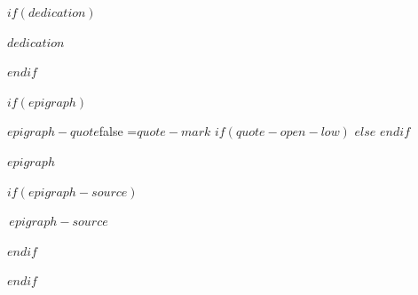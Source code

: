 \clearpage




\clearpage

$if(dedication)$
    \pagestyle{empty}

      \begin{center}

    \vspace*{\fill}
  
      \normalfont\normalsize $dedication$ \par

    \vspace*{\fill}
        \end{center}
    
    \clearpage
$endif$

$if(epigraph)$
    \pagestyle{empty}
    \begin{center}
    \begin{minipage}{0.7\textwidth}
      \setlength{\parindent}{0pt}
      \setlength{\parskip}{6pt}
      \def\epigraphquote{$epigraph-quote$}\def\epigraphnoquote{false}%
      \ifx\epigraphquote\epigraphnoquote\else
      =\hbox{{\normalfont\fontsize{48pt}{48pt}\selectfont\color{black!60}$quote-mark$}}%
      $if(quote-open-low)$
      $else$
      $endif$
      \fi
      {\itshape $epigraph$\par}
    $if(epigraph-source)$
      \vspace{8pt}
      {\raggedleft\textemdash\,\textsc{$epigraph-source$}\par}
    $endif$
    \end{minipage}
    \end{center}
    \clearpage
$endif$

